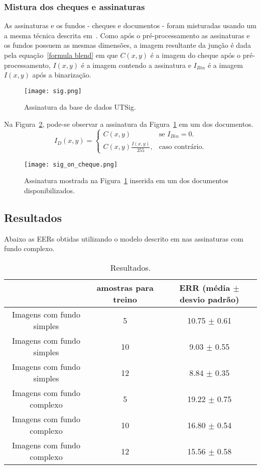 \documentclass[11pt, twocolumn, a4paper]{article}
\begin{document}
\subsubsection{Mistura dos cheques e assinaturas}
As assinaturas e os fundos - cheques e documentos - foram misturadas usando um a mesma técnica descrita em~\cite{checks paper}. Como após o pré-processamento as assinaturas e os fundos possuem as mesmas dimensões, a imagem resultante da junção é dada pela equação~\eqref{formula blend} em que $C(x, y)$ é a imagem do cheque após o pré-processamento, $I(x, y)$ é a imagem contendo a assinatura e $I_{Bin}$ é a imagem $I(x, y)$ após a binarização. 

\begin{figure}[!htb]
\centering
\texttt{[image: sig.png]}
\caption{Assinatura da base de dados UTSig.}
\label{sig}
\end{figure}

Na Figura~\ref{sig-on-cheque}, pode-se observar a assinatura da Figura~\ref{sig} em um dos documentos.
\begin{equation}
\label{formula blend}
I_D(x, y)=\begin{cases}
C(x, y) & \text{se $I_{Bin}=0$}.\\
C(x, y) \frac{I(x, y)}{255}, & \text{caso contrário}.
\end{cases}
\end{equation}

\begin{figure}[!htb]
\centering
\texttt{[image: sig\_on\_cheque.png]}
\caption{Assinatura mostrada na Figura~\ref{sig} inserida em um dos documentos disponibilizados.}
\label{sig-on-cheque}
\end{figure}

\subsection{Resultados}

Abaixo as EERs obtidas utilizando o modelo descrito em \cite{hafemann2} nas assinaturas com fundo complexo.

\begin{table*}[!htb]
	\setlength{\tabcolsep}{1mm}
	\centering
	\caption{Resultados.}
	\label{resultados}
	\begin{tabular}{ccc}
		\toprule
		& amostras para treino & ERR (média $\pm$ desvio padrão) \\
		\midrule
		Imagens com fundo simples & 5 & 10.75 $ \pm$ 0.61 \\
		Imagens com fundo simples & 10 & 9.03 $ \pm$ 0.55 \\
		Imagens com fundo simples & 12 & 8.84 $ \pm$ 0.35 \\
		Imagens com fundo complexo & 5 & 19.22 $ \pm$ 0.75 \\
		Imagens com fundo complexo & 10 & 16.80 $ \pm$ 0.54 \\
		Imagens com fundo complexo & 12 & 15.56 $ \pm$ 0.58 \\
		\bottomrule
	\end{tabular}
\end{table*}
\end{document}
